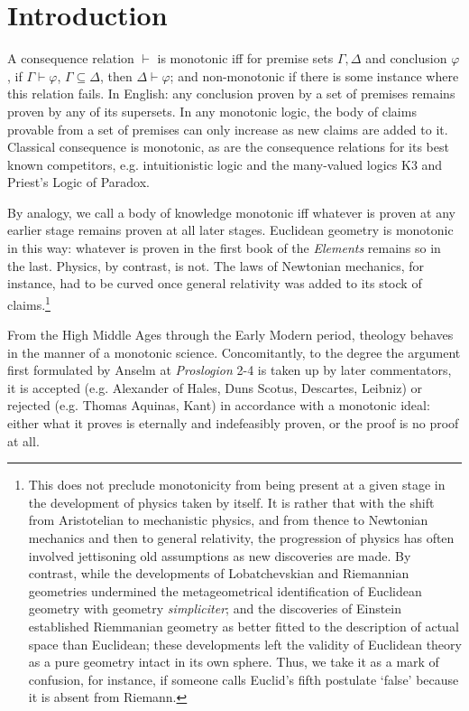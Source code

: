 \documentclass[]{birkjour}
\begin{document}
\section{Introduction}
A consequence relation $\vdash$ is monotonic iff for premise sets $\Gamma, \Delta$ and conclusion $\varphi$, if $\Gamma \vdash \varphi$, $\Gamma \subseteq \Delta$, then $\Delta \vdash \varphi$; and non-monotonic if there is some instance where this relation fails. In English: any conclusion proven by a set of premises remains proven by any of its supersets. In any monotonic logic, the body of claims provable from a set of premises can only increase as new claims are added to it. Classical consequence is monotonic, as are the consequence relations for its best known competitors, e.g. intuitionistic logic and the many-valued logics K3 and Priest's Logic of Paradox.

By analogy, we call a body of knowledge monotonic iff whatever is proven at any earlier stage remains proven at all later stages. Euclidean geometry is monotonic in this way: whatever is proven in the first book of the \textit{Elements} remains so in the last. Physics, by contrast, is not. The laws of Newtonian mechanics, for instance, had to be curved once general relativity was added to its stock of claims.\footnote{This does not preclude monotonicity from being present at a given stage in the development of physics taken by itself. It is rather that with the shift from Aristotelian to mechanistic physics, and from thence to Newtonian mechanics and then to general relativity, the progression of physics has often involved jettisoning old assumptions as new discoveries are made. By contrast, while the developments of Lobatchevskian and Riemannian geometries undermined the metageometrical identification of Euclidean geometry with geometry \textit{simpliciter}; and the discoveries of Einstein established Riemmanian geometry as better fitted to the description of actual space than Euclidean; these developments left the validity of Euclidean theory as a pure geometry intact in its own sphere. Thus, we take it as a mark of confusion, for instance, if someone calls Euclid's fifth postulate `false' because it is absent from Riemann.} 

From the High Middle Ages through the Early Modern period, theology behaves in the manner of a monotonic science. Concomitantly, to the degree the argument first formulated by Anselm at \textit{Proslogion} 2-4 is taken up by later commentators, it is accepted (e.g. Alexander of Hales, Duns Scotus, Descartes, Leibniz) or rejected (e.g. Thomas Aquinas, Kant) in accordance with a monotonic ideal: either what it proves is eternally and indefeasibly proven, or the proof is no proof at all.
\end{document}
